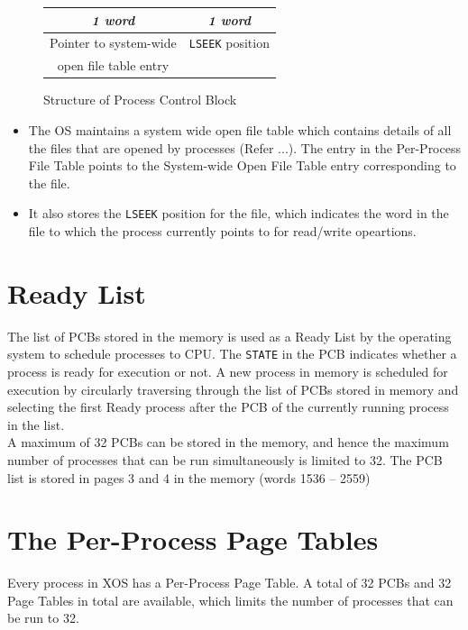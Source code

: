 \documentclass[11pt]{report}
\begin{document}
		\begin{figure}[htp!]
		\centering
		\begin{tabular}{|c|c|}
			\textit{1 word} & \textit{1 word} \\
			\hline
			Pointer to system-wide & \texttt{LSEEK} position\\ open file table entry &  \\
			\hline
		\end{tabular}
		\caption{Structure of Process Control Block}
	\end{figure}
\begin{itemize}
\item
The OS maintains a system wide open file table which contains details of all the files that are opened by processes (Refer ...). The entry in the Per-Process File Table points to the System-wide Open File Table entry corresponding to the file. 
\item It also stores the \texttt{LSEEK} position for the file, which indicates the word in the file to which the process currently points to for read/write opeartions. 
\end{itemize}




\section{Ready List}
\label{lbl:rdylst}

The list of PCBs stored in the memory is used as a Ready List by the operating system to schedule processes to CPU. The \texttt{STATE} in the PCB indicates whether a process is ready for execution or not.  A new process in memory is scheduled for execution by circularly traversing through the list of PCBs stored in memory and selecting the first Ready process after the PCB of the currently running process in the list.\\

A maximum of 32 PCBs can be stored in the memory, and hence the maximum number of processes that can be run simultaneously is limited to 32. The PCB list is stored in pages 3 and 4 in the memory (words 1536 -- 2559)

\section{The Per-Process Page Tables}
\label{lbl:pgtbl}
Every process in XOS has a Per-Process Page Table. A total of 32 PCBs and 32 Page Tables in total are available, which limits the number of processes that can be run to 32. \\
\end{document}
